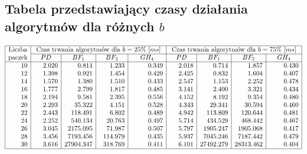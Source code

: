 \documentclass[polish,polish,a4paper]{article}
\begin{document}
\begin{spacing}{1.35}
\begin{figure}[H]
{			\subsection*{Tabela przedstawiający czasy działania algorytmów dla różnych $b$}}
		\begin{spacing}{1.7}
			\begin{equation*}
			\begin{array}{|r|r|r|r|r|r|r|r|r|}
			\hline
			\multicolumn{1}{|c|}{$Liczba$}&\multicolumn{4}{c|}{$ Czas trwania algorytmów dla $b=25\%$ $[ms]$ $}&\multicolumn{4}{c|}{$ Czas trwania algorytmów dla $b=75\%$ $[ms]$ $}\\\cline{2-9}
			\multicolumn{1}{|c|}{$paczek$}&
			\multicolumn{1}{c|}{\quad PD \quad}&\multicolumn{1}{c|}{\quad BF_{1}\quad}&\multicolumn{1}{c|}{\quad BF_{2}\quad}&\multicolumn{1}{c|}{\quad GH_{4}\quad}&
			\multicolumn{1}{c|}{\quad PD\quad}&\multicolumn{1}{c|}{\quad BF_{1}\quad}&\multicolumn{1}{c|}{\quad BF_{2}\quad}&\multicolumn{1}{c|}{\quad GH_{4}\quad}\\
			\hline
			10& 2.020& 0.814& 1.233& 0.349&2.018&0.714&1.857&0.430\\
			12& 1.398& 0.921& 1.454& 0.429&2.425&0.832&1.604&0.407\\
			14& 1.570& 1.380& 1.510& 0.433&2.547&1.153&2.252&0.478\\
			16& 1.777& 2.799& 1.817& 0.485&3.141&2.400&3.321&0.434\\
			18& 2.194& 9.581& 2.395& 0.556&4.152&8.192&9.354&0.480\\
			20& 2.293& 35.322& 4.151 &0.528&4.343&29.341&30.594&0.460\\
			22& 2.443 &118.491& 6.802 &0.489&4.942&113.809&120.644&0.481\\
			24& 2.252& 540.134 &20.763 &0.497&5.714&434.529&468.442&0.467\\
			26& 3.045& 2175.095 &71.987& 0.507&5.797&1905.247&1905.068&0.417\\
			28& 3.456& 7193.456 &114.979 &0.435&5.937&7045.246&7187.442&0.479\\
			30& 3.616& 27904.347 &318.769& 0.411&6.101&27492.279&28313.462&0.404\\
			\hline
			
			\end{array}
			\end{equation*}
		\end{spacing}
	\end{figure}
	
	
	
	\begin{figure}[H]
		\centering

\end{figure}
\end{spacing}
\end{document}
